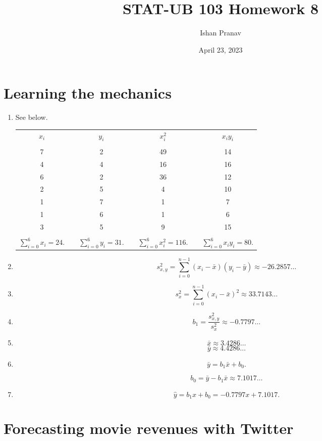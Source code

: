 \documentclass[12pt]{article}
\title{STAT-UB 103 Homework 8}
\author{Ishan Pranav}
\date{April 23, 2023}
\begin{document}
\maketitle
\section{Learning the mechanics}
\begin{enumerate}
\item See below.
\begin{center}
\begin{tabular}{ccccccc}
$x_i$&&$y_i$&&$x^2_i$&&$x_iy_i$\\\\
7&&2&&49&&14\\
4&&4&&16&&16\\
6&&2&&36&&12\\
2&&5&&4&&10\\
1&&7&&1&&7\\
1&&6&&1&&6\\
3&&5&&9&&15\\\\
$\sum_{i=0}^6{x_i}=24.$&&$\sum_{i=0}^6{y_i}=31.$&&$\sum_{i=0}^6{x^2_i}=116.$&&$\sum_{i=0}^6{x_iy_i}=80.$\\
\end{tabular}
\end{center}
\item\[s^2_{x,y}=\sum^{n-1}_{i=0}{(x_i-\bar{x})(y_i-\bar{y})}\approx -26.2857\dots\]
\item\[s^2_x=\sum^{n-1}_{i=0}{(x_i-\bar{x})^2}\approx 33.7143\dots\]
\item\[b_1=\frac{s^2_{x,y}}{s^2_x}\approx -0.7797\dots\]
\item\[\bar{x}\approx 3.4286\dots\]
\[\bar{y}\approx 4.4286\dots\]
\item\[\bar{y}=b_1\bar{x}+b_0.\]

\[b_0=\bar{y}-b_1\bar{x}\approx 7.1017\dots\]
\item\[\hat{y}=b_1x+b_0=-0.7797x+7.1017.\]
\end{enumerate}
\section{Forecasting movie revenues with Twitter}
\end{document}
